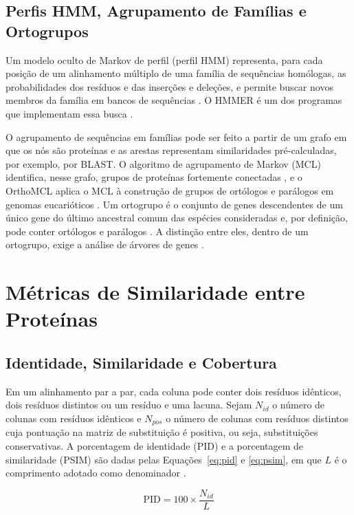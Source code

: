 \subsection{Perfis HMM, Agrupamento de Famílias e Ortogrupos}

Um modelo oculto de Markov de perfil (perfil HMM) representa, para cada posição de um alinhamento múltiplo de uma família de sequências homólogas, as probabilidades dos resíduos e das inserções e deleções, e permite buscar novos membros da família em bancos de sequências \cite{Durbin1998, Eddy2011}. O HMMER é um dos programas que implementam essa busca \cite{Eddy2011}.

O agrupamento de sequências em famílias pode ser feito a partir de um grafo em que os nós são proteínas e as arestas representam similaridades pré-calculadas, por exemplo, por BLAST. O algoritmo de agrupamento de Markov (MCL) identifica, nesse grafo, grupos de proteínas fortemente conectadas \cite{Enright2002}, e o OrthoMCL aplica o MCL à construção de grupos de ortólogos e parálogos em genomas eucarióticos \cite{Li2003}. Um ortogrupo é o conjunto de genes descendentes de um único gene do último ancestral comum das espécies consideradas e, por definição, pode conter ortólogos e parálogos \cite{EmmsKelly2015}. A distinção entre eles, dentro de um ortogrupo, exige a análise de árvores de genes \cite{EmmsKelly2019}.

\section{Métricas de Similaridade entre Proteínas}
\label{sec:metricas}

\subsection{Identidade, Similaridade e Cobertura}

Em um alinhamento par a par, cada coluna pode conter dois resíduos idênticos, dois resíduos distintos ou um resíduo e uma lacuna. Sejam $N_{id}$ o número de colunas com resíduos idênticos e $N_{pos}$ o número de colunas com resíduos distintos cuja pontuação na matriz de substituição é positiva, ou seja, substituições conservativas. A porcentagem de identidade (PID) e a porcentagem de similaridade (PSIM) são dadas pelas Equações~\ref{eq:pid} e \ref{eq:psim}, em que $L$ é o comprimento adotado como denominador \cite{Pearson2013}.

\begin{equation}
	\mathrm{PID} = 100 \times \frac{N_{id}}{L}
	\label{eq:pid}
\end{equation}

